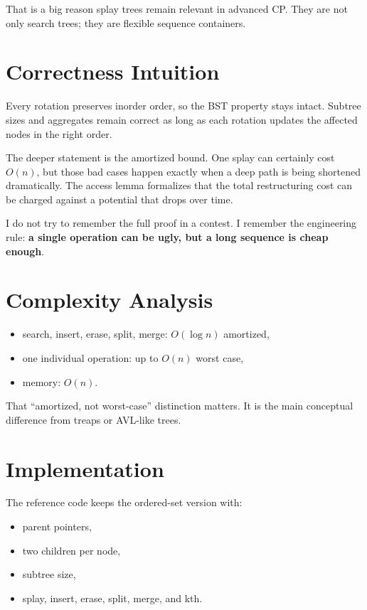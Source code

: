 That is a big reason splay trees remain relevant in advanced CP. They are not only search trees; they are flexible
sequence containers.

\section*{Correctness Intuition}

Every rotation preserves inorder order, so the BST property stays intact. Subtree sizes and aggregates remain correct
as long as each rotation updates the affected nodes in the right order.

The deeper statement is the amortized bound. One splay can certainly cost \(O(n)\), but those bad cases happen exactly
when a deep path is being shortened dramatically. The access lemma formalizes that the total restructuring cost can be
charged against a potential that drops over time.

I do not try to remember the full proof in a contest. I remember the engineering rule: \textbf{a single operation can
be ugly, but a long sequence is cheap enough}.

\section*{Complexity Analysis}

\begin{itemize}
  \item search, insert, erase, split, merge: \(O(\log n)\) amortized,
  \item one individual operation: up to \(O(n)\) worst case,
  \item memory: \(O(n)\).
\end{itemize}

That ``amortized, not worst-case'' distinction matters. It is the main conceptual difference from treaps or AVL-like
trees.

\section*{Implementation}

The reference code keeps the ordered-set version with:

\begin{itemize}
  \item parent pointers,
  \item two children per node,
  \item subtree size,
  \item splay, insert, erase, split, merge, and kth.
\end{itemize}

